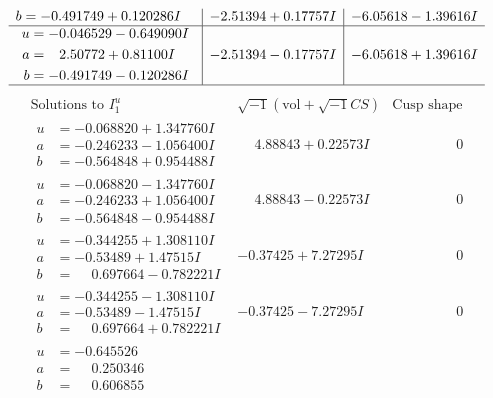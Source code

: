 \documentclass[1p]{elsarticle_modified}
\theoremstyle{definition}
\newcommand{\I}{\sqrt{-1}}
\begin{document}
$$\begin{array}{c|c|c}
\begin{aligned}
b &= -0.491749 + 0.120286 I\end{aligned}
 & -2.51394 + 0.17757 I & -6.05618 - 1.39616 I \\ \hline\begin{aligned}
u &= -0.046529 - 0.649090 I \\
a &= \phantom{-}2.50772 + 0.81100 I \\
b &= -0.491749 - 0.120286 I\end{aligned}
 & -2.51394 - 0.17757 I & -6.05618 + 1.39616 I\\
 \hline 
 \end{array}$$\newpage$$\begin{array}{c|c|c}  
\text{Solutions to }I^u_{1}& \I (\text{vol} + \sqrt{-1}CS) & \text{Cusp shape}\\
 \hline 
\begin{aligned}
u &= -0.068820 + 1.347760 I \\
a &= -0.246233 - 1.056400 I \\
b &= -0.564848 + 0.954488 I\end{aligned}
 & \phantom{-}4.88843 + 0.22573 I & \phantom{-0.000000 } 0 \\ \hline\begin{aligned}
u &= -0.068820 - 1.347760 I \\
a &= -0.246233 + 1.056400 I \\
b &= -0.564848 - 0.954488 I\end{aligned}
 & \phantom{-}4.88843 - 0.22573 I & \phantom{-0.000000 } 0 \\ \hline\begin{aligned}
u &= -0.344255 + 1.308110 I \\
a &= -0.53489 + 1.47515 I \\
b &= \phantom{-}0.697664 - 0.782221 I\end{aligned}
 & -0.37425 + 7.27295 I & \phantom{-0.000000 } 0 \\ \hline\begin{aligned}
u &= -0.344255 - 1.308110 I \\
a &= -0.53489 - 1.47515 I \\
b &= \phantom{-}0.697664 + 0.782221 I\end{aligned}
 & -0.37425 - 7.27295 I & \phantom{-0.000000 } 0 \\ \hline\begin{aligned}
u &= -0.645526\phantom{ +0.000000I} \\
a &= \phantom{-}0.250346\phantom{ +0.000000I} \\
b &= \phantom{-}0.606855\phantom{ +0.000000I}\end{aligned}

\end{array}$$
\end{document}
